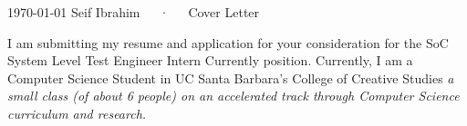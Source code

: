 \documentclass[11pt, letterpaper]{awesome-cv}
\begin{document}
\makecvheader[R]

\makecvfooter
  {\today}
  {Seif Ibrahim~~~·~~~Cover Letter}
  {}

\makelettertitle

\begin{cvletter}

I am submitting my resume and application for your consideration for the
SoC System Level Test Engineer Intern Currently position.
Currently, I am a Computer Science Student in UC Santa Barbara's College of Creative Studies \em a small class (of about 6 people) on an accelerated track through Computer Science curriculum and research.


\end{cvletter}


\makeletterclosing
\end{document}
